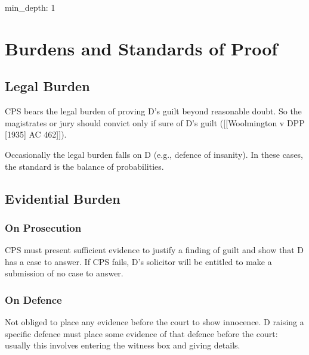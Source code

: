 \documentclass[
]{article}
\author{}
\date{}
\newenvironment{Shaded}{}{}
\newcommand{\NormalTok}[1]{#1}
\begin{document}
{
\setcounter{tocdepth}{3}
\tableofcontents
}
\begin{Shaded}
\begin{Highlighting}[]
\NormalTok{min\_depth: 1}
\end{Highlighting}
\end{Shaded}

\hypertarget{burdens-and-standards-of-proof}{%
\section{Burdens and Standards of
Proof}\label{burdens-and-standards-of-proof}}

\hypertarget{legal-burden}{%
\subsection{Legal Burden}\label{legal-burden}}

CPS bears the legal burden of proving D's guilt beyond reasonable doubt.
So the magistrates or jury should convict only if sure of D's guilt
({[}{[}Woolmington v DPP {[}1935{]} AC 462{]}{]}).

Occasionally the legal burden falls on D (e.g., defence of insanity). In
these cases, the standard is the balance of probabilities.

\hypertarget{evidential-burden}{%
\subsection{Evidential Burden}\label{evidential-burden}}

\hypertarget{on-prosecution}{%
\subsubsection{On Prosecution}\label{on-prosecution}}

CPS must present sufficient evidence to justify a finding of guilt and
show that D has a case to answer. If CPS fails, D's solicitor will be
entitled to make a submission of no case to answer.

\hypertarget{on-defence}{%
\subsubsection{On Defence}\label{on-defence}}

Not obliged to place any evidence before the court to show innocence. D
raising a specific defence must place some evidence of that defence
before the court: usually this involves entering the witness box and
giving details.
\end{document}
